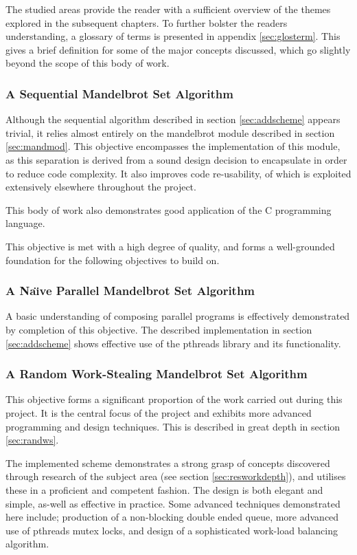     The studied areas provide the reader with a sufficient overview of the themes explored in the subsequent chapters. To further 
    bolster the readers understanding, a glossary of terms is presented in appendix \ref{sec:glosterm}. 
    This gives a brief definition for some of the major concepts discussed, which go slightly beyond the scope of this body of work.
    
\subsubsection*{A Sequential Mandelbrot Set Algorithm}
    Although the sequential algorithm described in section \ref{sec:addscheme} appears trivial, it relies almost entirely
    on the mandelbrot module described in section \ref{sec:mandmod}. This objective encompasses the implementation of this
    module, as this separation is derived from a sound design decision to encapsulate in order to reduce code complexity. 
    It also improves code re-usability, of which is exploited extensively elsewhere throughout the project. 
    
    This body of work also demonstrates good application of the C programming language.
    
    This objective is met with a high degree of quality, and forms a well-grounded foundation for the following objectives
    to build on.
    
\subsubsection*{A Na\"{\i}ve Parallel Mandelbrot Set Algorithm}
    A basic understanding of composing parallel programs is effectively demonstrated by completion of this objective.
    The described implementation in section \ref{sec:addscheme} shows effective use of the pthreads library and its functionality. 

\subsubsection*{A Random Work-Stealing Mandelbrot Set Algorithm}
    This objective forms a significant proportion of the work carried out during this project. It is the central focus of the 
    project and exhibits more advanced programming and design techniques. 
    This is described in great depth in section \ref{sec:randws}.
    
    The implemented scheme demonstrates a strong grasp of concepts discovered through research of the subject area (see section \ref{sec:resworkdepth}),
    and utilises these in a proficient and competent fashion. The design is both elegant and simple, as-well as effective in practice.
    Some advanced techniques demonstrated here include; production of a non-blocking double ended queue, more advanced use of pthreads mutex locks, and
    design of a sophisticated work-load balancing algorithm.

